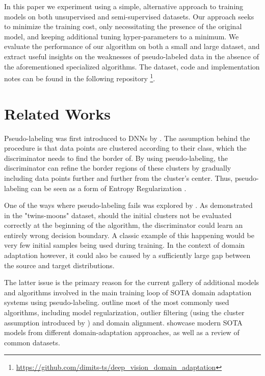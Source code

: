 \documentclass{article}
\begin{document}
	In this paper we experiment using a simple, alternative approach to training models on both unsupervised and semi-supervised datasets. Our approach seeks to minimize the training cost, only necessitating the presence of the original model, and keeping additional tuning hyper-parameters to a minimum. We evaluate the performance of our algorithm on both a small and large dataset, and extract useful insights on the weaknesses of pseudo-labeled data in the absence of the aforementioned specialized algorithms. The dataset, code and implementation notes can be found in the following repository \footnote{\url{https://github.com/dimits-ts/deep\_vision\_domain\_adaptation}}.
	
	
	\section{Related Works}
	
	Pseudo-labeling was first introduced to DNNs by \cite{pseudo-label-original}. The assumption behind the procedure is that data points are clustered according to their class, which the discriminator needs to find the border of. By using pseudo-labeling, the discriminator can refine the border regions of these clusters by gradually including data points further and further from the cluster's center. Thus, pseudo-labeling can be seen as a form of Entropy Regularization \cite{entropy-regularization}.
	
	One of the ways where pseudo-labeling fails was explored by \cite{pseudo-label-evaluation}. As demonstrated in the "twins-moons" dataset, should the initial clusters not be evaluated correctly at the beginning of the algorithm, the discriminator could learn an entirely wrong decision boundary. A classic example of this happening would be very few initial samples being used during training. In the context of domain adaptation however, it could also be caused by a sufficiently large gap between the source and target distributions.
	
	The latter issue is the primary reason for the current gallery of additional models and algorithms involved in the main training loop of SOTA domain adaptation systems using pseudo-labeling. \cite{good-practices} outline most of the most commonly used algorithms, including model regularization, outlier filtering (using the cluster assumption introduced by \cite{pseudo-label-original}) and domain alignment. \cite{model-survey} showcase modern SOTA models from different domain-adaptation approaches, as well as a review of common datasets.
	
\end{document}
